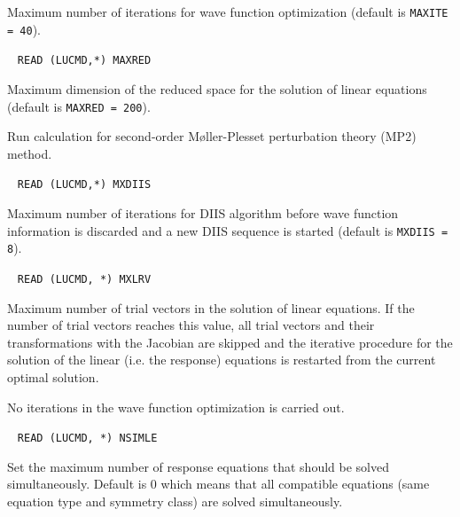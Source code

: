 \begin{description}
  Maximum number of iterations for wave function optimization 
  (default is \verb+MAXITE = 40+).
 
\item[\Key{MAXRED}] \verb| |\newline 
  \verb|READ (LUCMD,*) MAXRED|

  Maximum dimension of the reduced space for the 
  solution of linear equations (default is \verb+MAXRED = 200+).
 
%
%
\item[\Key{MP2}]    
Run calculation for second-order M{\o}ller-Plesset perturbation theory
(MP2) method.

\item[\Key{MXDIIS}] \verb| |\newline
  \verb|READ (LUCMD,*) MXDIIS|

  Maximum number of iterations for DIIS algorithm
  before wave function information is discarded and a new DIIS 
  sequence is started
  (default is \verb+MXDIIS = 8+).
 
\item[\Key{MXLRV}] \verb| |\newline
  \verb|READ (LUCMD, *) MXLRV|

  Maximum number of trial vectors in the solution of 
  linear equations. If the number of trial vectors reaches this
  value, all trial vectors and their transformations with the
  Jacobian are skipped and the iterative procedure for the solution of the
  linear (i.e. the response) equations is restarted from the current 
  optimal solution. 
 
\item[\Key{NOCCIT}]
   No iterations in the wave function optimization is carried out.

\item[\Key{NSIMLE}] \verb| |\newline
  \verb|READ (LUCMD, *) NSIMLE|

  Set the maximum number of response equations that should be 
  solved simultaneously. Default is 0 which means that all
  compatible equations (same equation type and symmetry class) 
  are solved simultaneously.
 

\end{description}

